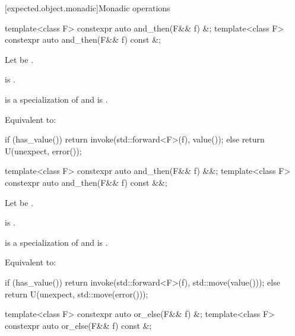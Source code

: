 [expected.object.monadic]{Monadic operations}

%
\begin{itemdecl}
template<class F> constexpr auto and_then(F&& f) &;
template<class F> constexpr auto and_then(F&& f) const &;
\end{itemdecl}

\begin{itemdescr}
\pnum
Let  be .

\pnum
\constraints
{} is .

\pnum
\mandates
{} is a specialization of  and
 is .

\pnum
\effects
Equivalent to:
\begin{codeblock}
if (has_value())
  return invoke(std::forward<F>(f), value());
else
  return U(unexpect, error());
\end{codeblock}
\end{itemdescr}

%
\begin{itemdecl}
template<class F> constexpr auto and_then(F&& f) &&;
template<class F> constexpr auto and_then(F&& f) const &&;
\end{itemdecl}

\begin{itemdescr}
\pnum
Let  be
.

\pnum
\constraints
{} is .

\pnum
\mandates
{} is a specialization of  and
 is .

\pnum
\effects
Equivalent to:
\begin{codeblock}
if (has_value())
  return invoke(std::forward<F>(f), std::move(value()));
else
  return U(unexpect, std::move(error()));
\end{codeblock}
\end{itemdescr}

%
\begin{itemdecl}
template<class F> constexpr auto or_else(F&& f) &;
template<class F> constexpr auto or_else(F&& f) const &;
\end{itemdecl}

